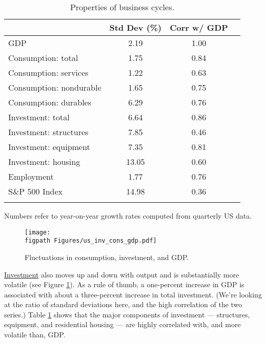 \begin{table}[!ht]
\centering
\caption{Properties of business cycles.}
\label{tab:cycleprops}
\begin{tabular*}{0.8\textwidth}{l@{\extracolsep{\fill}}ccc}
\toprule
        &  Std Dev (\%)  &  Corr w/ GDP  \\
\midrule
GDP     &      2.19          &    1.00      \\
Consumption:  total      &  1.75  &  0.84   \\
Consumption:  services   &  1.22  &  0.63   \\
Consumption:  nondurable &  1.65  &  0.75   \\
Consumption:  durables   &  6.29  &  0.76   \\
Investment:  total       &  6.64  &  0.86   \\
Investment:  structures  &  7.85  &  0.46   \\
Investment:  equipment   &  7.35  &  0.81   \\
Investment:  housing     &  13.05\phantom{1} &  0.60   \\
Employment               &  1.77  &  0.76   \\
S\&P 500 Index           &  14.98\phantom{1}  &  0.36   \\
\bottomrule
\addlinespace
\end{tabular*}
\begin{minipage}{0.8\textwidth}
\footnotesize{Numbers refer to year-on-year growth rates computed from quarterly US data.}
\end{minipage}
\end{table}

\begin{figure}[!ht]
    \caption{Fluctuations in consumption, investment, and GDP.}
    \label{fig:gcall}%
    \centering
    \texttt{[image: \\figpath Figures/us\_inv\_cons\_gdp.pdf]}
\end{figure}

\href{http://research.stlouisfed.org/fred2/series/GPDIC96?cid=112}{Investment}
also moves up and down with output
and is substantially more volatile (see Figure \ref{fig:gcall}).
As a rule of thumb, a one-percent increase in GDP is associated with
about a three-percent increase in total investment.
(We're looking at the ratio of standard deviations here,
and the high correlation of the two series.)
Table \ref{tab:cycleprops}
shows that the major components of investment --- structures, equipment,
and residential housing --- are highly correlated with,
and more volatile than, GDP.


